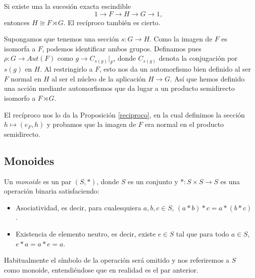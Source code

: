 \documentclass[TFG.tex]{subfiles}
\begin{document}
\begin{prop}\label{semidirect}
Si existe una la sucesión exacta escindible
\[
1\to F\to H\to G\to 1,
\]
entonces $H\cong F\rtimes G$. El recíproco también es cierto. 
\end{prop}
\begin{dem}
Supongamos que tenemos una sección $s:G\to H$. Como la imagen de $F$ es isomorfa a $F$, podemos identificar ambos grupos. Definamos pues $\rho:G\to Aut(F)$ como $g\to C_{s(g)}|_F$, donde $C_{s(g)}$ denota la conjugación por $s(g)$ en $H$. Al restringirlo a $F$, esto nos da un automorfismo bien definido al ser $F$ normal en $H$ al ser el núcleo de la aplicación $H\to G$. Así que hemos definido una acción mediante automorfismos que da lugar a un producto semidirecto isomorfo a $F\rtimes G$. 

El recíproco nos lo da la Proposición \ref{reciproco}, en la cual definimos la sección $h\mapsto (e_F,h)$ y probamos que la imagen de $F$ era normal en el producto semidirecto.
\QED
\end{dem}
% 
%


\subsection{Monoides}

\begin{defi}
Un \emph{monoide} es un par $(S,*)$, donde $S$ es un conjunto y $*:S\times S\to S$ es una operación binaria satisfaciendo:
\begin{itemize}
\item Asociatividad, es decir, para cualesquiera $a,b,c\in S$, $(a*b)*c=a*(b*c)$.
\item Existencia de elemento neutro, es decir, existe $e\in S$ tal que para todo $a\in S$, $e*a=a*e=a$. 
\end{itemize}
Habitualmente el símbolo de la operación será omitido y nos referiremos a $S$ como monoide, entendiéndose que en realidad es el par anterior.
\end{defi}
\end{document}
